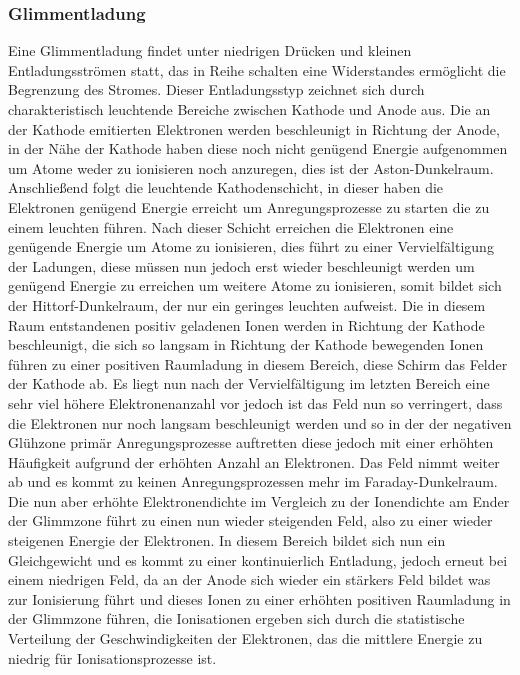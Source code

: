 \subsubsection{Glimmentladung}
Eine Glimmentladung findet unter niedrigen Drücken und kleinen Entladungsströmen statt, das in Reihe schalten eine Widerstandes ermöglicht die Begrenzung des Stromes.
Dieser Entladungsstyp zeichnet sich durch charakteristisch leuchtende Bereiche zwischen Kathode und Anode aus. Die an der Kathode emitierten Elektronen werden beschleunigt in Richtung der Anode, in der Nähe der Kathode haben diese noch nicht genügend Energie aufgenommen um Atome weder zu ionisieren noch anzuregen, dies ist der Aston-Dunkelraum. Anschließend folgt die leuchtende Kathodenschicht, in dieser haben die Elektronen genügend Energie erreicht um Anregungsprozesse zu starten die zu einem leuchten führen. Nach dieser Schicht erreichen die Elektronen eine genügende Energie um Atome zu ionisieren, dies führt zu einer Vervielfältigung der Ladungen, diese müssen nun jedoch erst wieder beschleunigt werden um genügend Energie zu erreichen um weitere Atome zu ionisieren, somit bildet sich der Hittorf-Dunkelraum, der nur ein geringes leuchten aufweist. Die in diesem Raum entstandenen positiv geladenen Ionen werden in Richtung der Kathode beschleunigt, die sich so langsam in Richtung der Kathode bewegenden Ionen führen zu einer positiven Raumladung in diesem Bereich, diese Schirm das Felder der Kathode ab. Es liegt nun nach der Vervielfältigung im letzten Bereich eine sehr viel höhere Elektronenanzahl vor jedoch ist das Feld nun so verringert, dass die Elektronen nur noch langsam beschleunigt werden und so in der der negativen Glühzone primär Anregungsprozesse auftretten diese jedoch mit einer erhöhten Häufigkeit aufgrund der erhöhten Anzahl an Elektronen. Das Feld nimmt weiter ab und es kommt zu keinen Anregungsprozessen mehr im Faraday-Dunkelraum. Die nun aber erhöhte Elektronendichte im Vergleich zu der Ionendichte am Ender der Glimmzone führt zu einen nun wieder steigenden Feld, also zu einer wieder steigenen Energie der Elektronen. In diesem Bereich bildet sich nun ein Gleichgewicht und es kommt zu einer kontinuierlich Entladung, jedoch erneut bei einem niedrigen Feld, da an der Anode sich wieder ein stärkers Feld bildet was zur Ionisierung führt und dieses Ionen zu einer erhöhten positiven Raumladung in der Glimmzone führen, die Ionisationen ergeben sich durch die statistische Verteilung der Geschwindigkeiten der Elektronen, das die mittlere Energie zu niedrig für Ionisationsprozesse ist. \cite{stroth2018}

